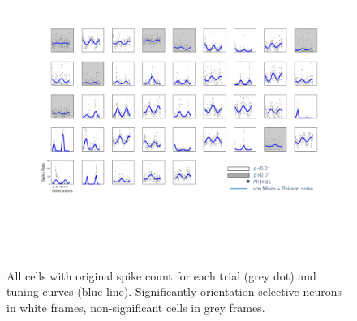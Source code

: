 \documentclass[10pt]{article}
\begin{document}
\newpage

\begin{figure}[!h]
\centering
\includegraphics[width=1\linewidth]{BIG1.png}
\caption{ All cells with original spike count for each trial (grey dot) and tuning curves (blue line). Significantly orientation-selective neurons in white frames, non-significant cells in grey frames.}
\end{figure}


\end{document}

